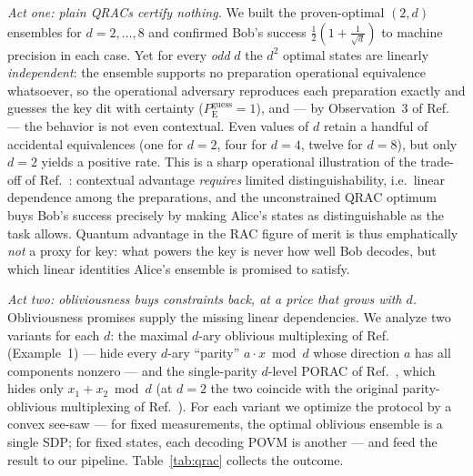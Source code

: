 \documentclass[aps,pra,twocolumn,superscriptaddress,longbibliography,nofootinbib]{revtex4-2}
\newcommand{\Eve}{\mathrm{E}}
\newcommand{\pguess}{P_{\Eve}^{\mathrm{guess}}}
\begin{document}
\emph{Act one: plain QRACs certify nothing.} We built the
proven-optimal $(2,d)$ ensembles for $d=2,\dots,8$ and confirmed Bob's
success $\tfrac12(1+\tfrac1{\sqrt d})$ to machine precision in each
case. Yet for every \emph{odd} $d$ the $d^{2}$ optimal states are
linearly \emph{independent}: the ensemble supports no preparation
operational equivalence whatsoever, so the operational adversary
reproduces each preparation exactly and guesses the key dit with
certainty ($\pguess=1$), and --- by Observation~3 of
Ref.~\cite{ChaturvediFarkasWright2021} --- the behavior is not even
contextual. Even values of $d$ retain a handful of accidental
equivalences (one for $d=2$, four for $d=4$, twelve for $d=8$), but
only $d=2$ yields a positive rate. This is a sharp operational
illustration of the trade-off of Ref.~\cite{Baldijao2026}: contextual
advantage \emph{requires} limited distinguishability, i.e.\ linear
dependence among the preparations, and the unconstrained QRAC optimum
buys Bob's success precisely by making Alice's states as
distinguishable as the task allows. Quantum advantage in the RAC
figure of merit is thus emphatically \emph{not} a proxy for key: what
powers the key is never how well Bob decodes, but which linear
identities Alice's ensemble is promised to satisfy.

\emph{Act two: obliviousness buys constraints back, at a price that
grows with $d$.} Obliviousness promises supply the missing linear
dependencies. We analyze two variants for each $d$: the maximal
$d$-ary oblivious multiplexing of Ref.~\cite{Baldijao2026} (Example~1)
--- hide every $d$-ary ``parity'' $a\cdot x\bmod d$ whose direction
$a$ has all components nonzero --- and the single-parity $d$-level
PORAC of Ref.~\cite{AmbainisBanik2019}, which hides only
$x_{1}+x_{2}\bmod d$ (at $d=2$ the two coincide with the original
parity-oblivious multiplexing of Ref.~\cite{SpekkensPOM2009}). For
each variant we optimize the protocol by a convex see-saw --- for
fixed measurements, the optimal oblivious ensemble is a single SDP;
for fixed states, each decoding POVM is another --- and feed the
result to our pipeline. Table~\ref{tab:qrac} collects the outcome.
\end{document}
